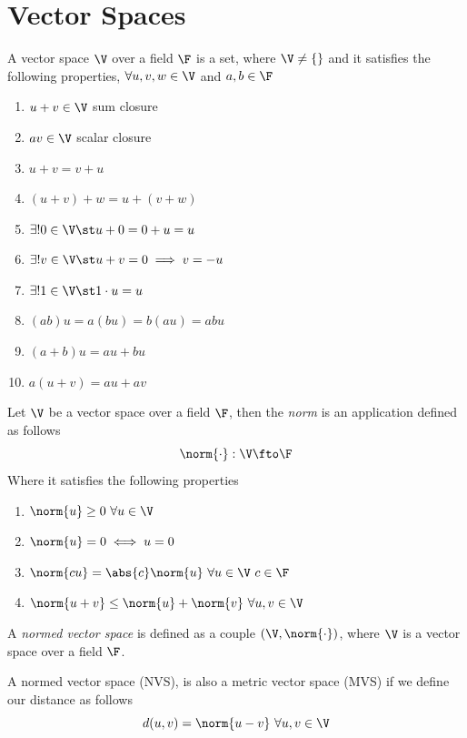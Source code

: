 \documentclass[../mmf.tex]{subfiles}
\begin{document}
\section{Vector Spaces}
\begin{dfn}
	A vector space $\V$ over a field $\F$ is a set, where $\V\ne\{\}$ and it satisfies the following properties, $\forall u,v,w\in\V$ and $a,b\in\F$
	\begin{enumerate}
	\item $u+v\in\V$ sum closure
	\item $av\in\V$ scalar closure
	\item $u+v=v+u$
	\item $(u+v)+w=u+(v+w)$
	\item $\exists!0\in\V\st u+0=0+u=u$
	\item $\exists!v\in\V\st u+v=0\implies{} v=-u$
	\item $\exists!1\in\V\st 1\cdot u=u$
	\item $(ab)u=a(bu)=b(au)=abu$
	\item $(a+b)u=au+bu$
	\item $a(u+v)=au+av$
	\end{enumerate}
\end{dfn}
\begin{dfn}[Norm]
	Let $\V$ be a vector space over a field $\F$, then the \textit{norm} is an application defined as follows
	\begin{equation*}
		\norm{\cdot}:\V\fto\F
	\end{equation*}
	Where it satisfies the following properties
	\begin{enumerate}
	\item $\norm{u}\ge0\ \forall u\in\V$
	\item $\norm{u}=0\iff u=0$
	\item $\norm{cu}=\abs{c}\norm{u}\ \forall u\in\V\ c\in\F$
	\item $\norm{u+v}\le\norm{u}+\norm{v}\ \forall u,v\in\V$
	\end{enumerate}
\end{dfn}
\begin{dfn}
	A \textit{normed vector space} is defined as a couple $(\V,\norm{\cdot})$, where $\V$ is a vector space over a field $\F$.
\end{dfn}
\begin{prop}
	A normed vector space (NVS), is also a metric vector space (MVS) if we define our distance as follows
	\begin{equation*}
		d(u,v)=\norm{u-v}\ \forall u,v\in\V
	\end{equation*}
\end{prop}
\end{document}
